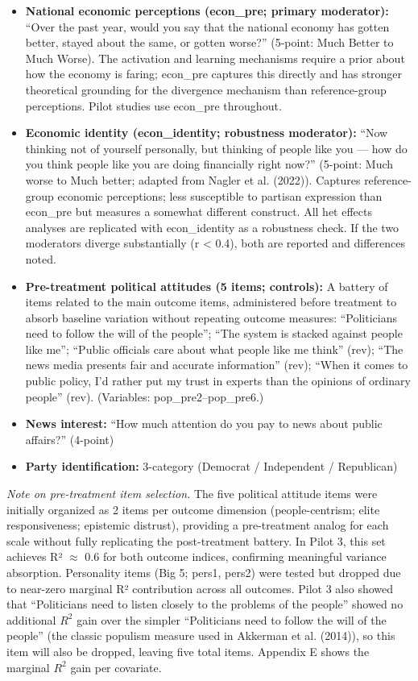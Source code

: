 \documentclass[
  12pt]{article}
\providecommand{\tightlist}{%
  \setlength{\itemsep}{0pt}\setlength{\parskip}{0pt}}
\begin{document}
\begin{itemize}
\tightlist
\item
  \textbf{National economic perceptions (econ\_pre; primary moderator):}
  ``Over the past year, would you say that the national economy has
  gotten better, stayed about the same, or gotten worse?'' (5-point:
  Much Better to Much Worse). The activation and learning mechanisms
  require a prior about how the economy is faring; econ\_pre captures
  this directly and has stronger theoretical grounding for the
  divergence mechanism than reference-group perceptions. Pilot studies
  use econ\_pre throughout.
\item
  \textbf{Economic identity (econ\_identity; robustness moderator):}
  ``Now thinking not of yourself personally, but thinking of people like
  you --- how do you think people like you are doing financially right
  now?'' (5-point: Much worse to Much better; adapted from Nagler et al.
  (2022)). Captures reference-group economic perceptions; less
  susceptible to partisan expression than econ\_pre but measures a
  somewhat different construct. All het effects analyses are replicated
  with econ\_identity as a robustness check. If the two moderators
  diverge substantially (r \textless{} 0.4), both are reported and
  differences noted.
\item
  \textbf{Pre-treatment political attitudes (5 items; controls):} A
  battery of items related to the main outcome items, administered
  before treatment to absorb baseline variation without repeating
  outcome measures: ``Politicians need to follow the will of the
  people''; ``The system is stacked against people like me''; ``Public
  officials care about what people like me think'' (rev); ``The news
  media presents fair and accurate information'' (rev); ``When it comes
  to public policy, I'd rather put my trust in experts than the opinions
  of ordinary people'' (rev). (Variables: pop\_pre2--pop\_pre6.)
\item
  \textbf{News interest:} ``How much attention do you pay to news about
  public affairs?'' (4-point)
\item
  \textbf{Party identification:} 3-category (Democrat / Independent /
  Republican)
\end{itemize}

\emph{Note on pre-treatment item selection.} The five political attitude
items were initially organized as 2 items per outcome dimension
(people-centrism; elite responsiveness; epistemic distrust), providing a
pre-treatment analog for each scale without fully replicating the
post-treatment battery. In Pilot 3, this set achieves R² \(\approx\) 0.6
for both outcome indices, confirming meaningful variance absorption.
Personality items (Big 5; pers1, pers2) were tested but dropped due to
near-zero marginal R² contribution across all outcomes. Pilot 3 also
showed that ``Politicians need to listen closely to the problems of the
people'' showed no additional \(R^2\) gain over the simpler
``Politicians need to follow the will of the people'' (the classic
populism measure used in Akkerman et al. (2014)), so this item will also
be dropped, leaving five total items. Appendix E shows the marginal
\(R^2\) gain per covariate.
\end{document}
